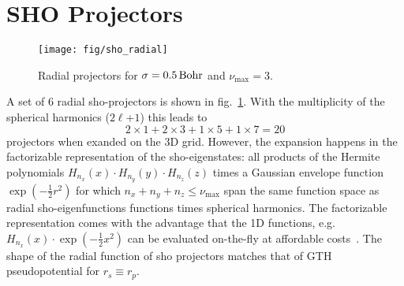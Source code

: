 \documentclass[oribibl]{llncs}
\newcommand{\um}[1]{_{\mathrm{#1}}}
\begin{document}
\section{SHO Projectors}

%
\begin{figure}
  \begin{minipage}[c]{.990\textwidth}
	\texttt{[image: fig/sho\_radial]} %
  \end{minipage}\hfill
  \begin{minipage}[c]{.009\textwidth}
  \end{minipage}
  \label{fig:sho-radial-projectors}
  \caption{
  Radial projectors for $\sigma = \unit[0.5]{Bohr}$ and $\nu\um{max} = 3$.
  }
\end{figure}
%
%
A set of $6$ radial \ac{sho}-projectors is shown in fig.~\ref{fig:sho-radial-projectors}.
With the multiplicity of the spherical harmonics ($2\ell$+$1$) this leads to 
$$2 \times 1 + 2 \times 3 + 1 \times 5 + 1 \times 7 = 20$$
projectors when exanded on the 3D grid.
However, the expansion happens in the factorizable representation of the
\ac{sho}-eigenstates: all products of the Hermite polynomials 
$H_{n_x}(x) \cdot H_{n_y}(y) \cdot H_{n_z}(z)$ 
times a Gaussian envelope function $\exp(-\frac12 r^2)$
for which $n_x + n_y + n_z \leq \nu\um{max}$ span the same function space
as radial \ac{sho}-eigenfunctions functions times spherical harmonics.
The factorizable representation comes with the advantage that the 1D functions,
e.g.~$H_{n_x}(x) \cdot \exp(-\frac 12 x^2)$ can be evaluated on-the-fly 
at affordable costs~\cite{BaumeisterTsukamotoPASC19}.
The shape of the radial function of \ac{sho} projectors
matches that of GTH pseudopotential\cite{PhysRevB.54.1703}
for $r_s \equiv r_p$.
\end{document}
